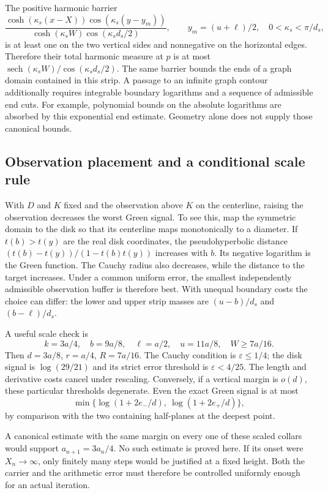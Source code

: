 The positive harmonic barrier
\[
 \frac{\cosh(\kappa_s(x-X))\cos(\kappa_s(y-y_m))}
 {\cosh(\kappa_s W)\cos(\kappa_s d_s/2)},
 \qquad y_m=(u+\ell)/2,\quad0<\kappa_s<\pi/d_s,
\]
is at least one on the two vertical sides and nonnegative on the
horizontal edges. Therefore their total harmonic measure at $p$ is
at most $\operatorname{sech}(\kappa_s W)/\cos(\kappa_s d_s/2)$.
The same barrier bounds the ends of a graph domain contained in this
strip. A passage to an infinite graph contour additionally requires
integrable boundary logarithms and a sequence of admissible end cuts.
For example, polynomial bounds on the absolute logarithms are absorbed
by this exponential end estimate. Geometry alone does not supply those
canonical bounds.

\subsection{Observation placement and a conditional scale rule}

With $D$ and $K$ fixed and the observation above $K$ on the centerline,
raising the observation decreases the worst Green signal. To see this,
map the symmetric domain to the disk so that its centerline maps
monotonically to a diameter. If $t(b)>t(y)$ are the real disk
coordinates, the pseudohyperbolic distance
$(t(b)-t(y))/(1-t(b)t(y))$ increases with $b$. Its negative logarithm
is the Green function. The Cauchy radius also decreases, while the
distance to the target increases. Under a common uniform error, the
smallest independently admissible observation buffer is therefore best.
With unequal boundary costs the choice can differ: the lower and upper
strip masses are $(u-b)/d_s$ and $(b-\ell)/d_s$.

A useful scale check is
\[
 k=3a/4,\quad b=9a/8,\quad\ell=a/2,\quad u=11a/8,
 \quad W\ge7a/16.
\]
Then $d=3a/8$, $r=a/4$, $R=7a/16$.
The Cauchy condition is $\varepsilon\le1/4$; the disk signal is
$\log(29/21)$ and its strict error threshold is $\varepsilon<4/25$.
The length and derivative costs cancel under rescaling. Conversely,
if a vertical margin is $o(d)$, these particular thresholds degenerate.
Even the exact Green signal is at most
\[
 \min\{\log(1+2e_-/d),\ \log(1+2e_+/d)\},
\]
by comparison with the two containing half-planes at the deepest point.

A canonical estimate with the same margin on every one of these
scaled collars would support $a_{n+1}=3a_n/4$. No such estimate is
proved here. If its onset were $X_n\to\infty$, only finitely many
steps would be justified at a fixed height. Both the carrier and the
arithmetic error must therefore be controlled uniformly enough for an
actual iteration.
